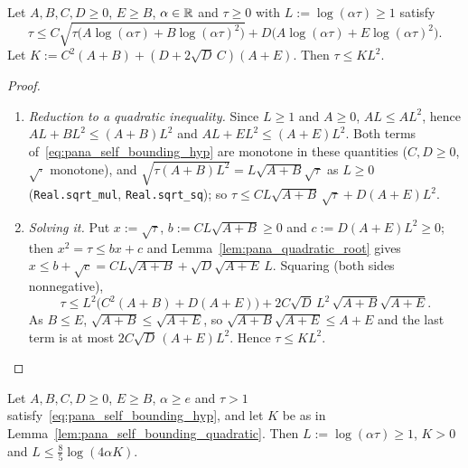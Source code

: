 \begin{lemma}\label{lem:pana_self_bounding_quadratic}
\leanok
Let $A, B, C, D \ge 0$, $E \ge B$, $\alpha \in \mathbb{R}$ and $\tau \ge 0$ with $L := \log(\alpha\tau) \ge 1$
satisfy
\begin{equation}\label{eq:pana_self_bounding_hyp}
  \tau \le C\sqrt{\tau\big(A\log(\alpha\tau) + B\log(\alpha\tau)^2\big)}
  + D\big(A\log(\alpha\tau) + E\log(\alpha\tau)^2\big) .
\end{equation}
Let $K := C^2(A + B) + (D + 2\sqrt D\,C)(A + E)$. Then $\tau \le K L^2$.
\end{lemma}

\begin{proof}
\leanok
\begin{enumerate}
  \item[(i)] \emph{Reduction to a quadratic inequality.} Since $L \ge 1$ and $A \ge 0$,
        $AL \le AL^2$, hence $AL + BL^2 \le (A + B)L^2$ and $AL + EL^2 \le (A + E)L^2$. Both
        terms of~\eqref{eq:pana_self_bounding_hyp} are monotone in these quantities ($C, D \ge 0$,
        $\sqrt{\cdot}$ monotone), and $\sqrt{\tau(A + B)L^2} = L\sqrt{A+B}\sqrt\tau$ as $L \ge 0$
        (\texttt{Real.sqrt\_mul}, \texttt{Real.sqrt\_sq}); so
        $\tau \le CL\sqrt{A + B}\,\sqrt\tau + D(A + E)L^2$.
  \item[(ii)] \emph{Solving it.} Put $x := \sqrt\tau$, $b := CL\sqrt{A+B} \ge 0$ and
        $c := D(A+E)L^2 \ge 0$; then $x^2 = \tau \le bx + c$ and Lemma~\ref{lem:pana_quadratic_root}
        gives $x \le b + \sqrt c = CL\sqrt{A+B} + \sqrt D\sqrt{A+E}\,L$. Squaring (both sides
        nonnegative),
        \[
          \tau \le L^2\Big(C^2(A+B) + D(A+E)\Big) + 2C\sqrt D\,L^2\,\sqrt{A+B}\sqrt{A+E} .
        \]
        As $B \le E$, $\sqrt{A+B} \le \sqrt{A+E}$, so $\sqrt{A+B}\sqrt{A+E} \le A + E$ and
        the last term is at most $2C\sqrt D\,(A+E)L^2$. Hence $\tau \le KL^2$.
\end{enumerate}
\end{proof}

\begin{lemma}\label{lem:pana_self_bounding_log}
\leanok
Let $A, B, C, D \ge 0$, $E \ge B$, $\alpha \ge e$ and $\tau > 1$
satisfy~\eqref{eq:pana_self_bounding_hyp}, and let $K$ be as in
Lemma~\ref{lem:pana_self_bounding_quadratic}. Then $L := \log(\alpha\tau) \ge 1$, $K > 0$ and
$L \le \frac85\log(4\alpha K)$.
\end{lemma}

